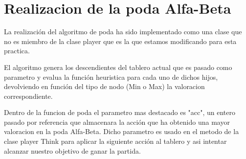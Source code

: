 \section{Realizacion de la poda Alfa-Beta}
\label{sec:poda}

	La realización del algoritmo de poda ha sido implementado como una clase que no es miembro de la clase player que es la que estamos modificando para esta practica.

	El algoritmo genera los descendientes del tablero actual que es pasado como parametro y evalua la función heuristica para cada uno de dichos hijos, devolviendo en función del tipo de nodo (Min o Max) la valoracion correspondiente.

	Dentro de la funcion de poda el parametro mas destacado es "acc", un entero pasado por referencia que almacenara la acción que ha obtenido una mayor valoracion en la poda Alfa-Beta. Dicho parametro es usado en el metodo de la clase player Think para aplicar la siguiente acción al tablero y asi intentar alcanzar nuestro objetivo de ganar la partida.
